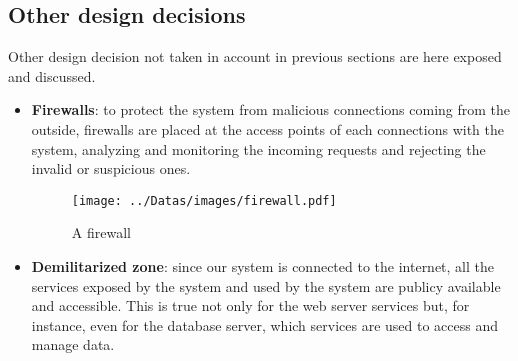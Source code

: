 \subsection{Other design decisions}

\label{sec:other-design-decisions}

Other design decision not taken in account in previous sections are here exposed and discussed.

\begin{itemize}
	\item \textbf{Firewalls}: to protect the system from malicious connections coming from the outside, firewalls are placed at the access points of each connections with the system, analyzing and monitoring the incoming requests and rejecting the invalid or suspicious ones.
\begin{figure}[H]
	\centerline{
		\texttt{[image: ../Datas/images/firewall.pdf]}
	}
	\caption{A firewall}
	\label{fig:firewall}
\end{figure}

	\item \textbf{Demilitarized zone}: since our system is connected to the internet, all the services exposed by the system and used by the system are publicy available and accessible. This is true not only for the web server services but, for instance, even for the database server, which services are used to access and manage data. 


\end{itemize}
